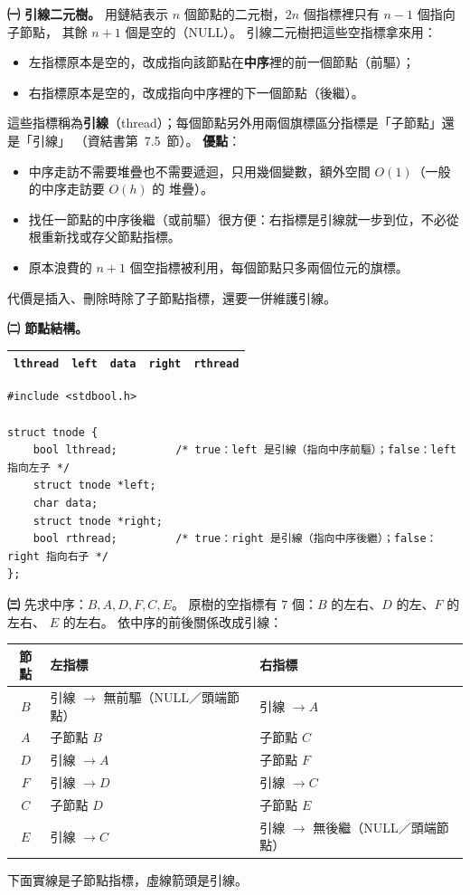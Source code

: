 \begin{pastsoln}
\textbf{㈠ 引線二元樹。} 用鏈結表示 $n$ 個節點的二元樹，$2n$ 個指標裡只有 $n - 1$ 個指向子節點，
其餘 $n + 1$ 個是空的（NULL）。 引線二元樹把這些空指標拿來用：
\begin{itemize}[nosep]
\item 左指標原本是空的，改成指向該節點在\textbf{中序}裡的前一個節點（前驅）；
\item 右指標原本是空的，改成指向中序裡的下一個節點（後繼）。
\end{itemize}
這些指標稱為\textbf{引線}（thread）；每個節點另外用兩個旗標區分指標是「子節點」還是「引線」
（資結書第~7.5~節）。
\textbf{優點}：
\begin{itemize}[nosep]
\item 中序走訪不需要堆疊也不需要遞迴，只用幾個變數，額外空間 $O(1)$（一般的中序走訪要 $O(h)$ 的
堆疊）。
\item 找任一節點的中序後繼（或前驅）很方便：右指標是引線就一步到位，不必從根重新找或存父節點指標。
\item 原本浪費的 $n + 1$ 個空指標被利用，每個節點只多兩個位元的旗標。
\end{itemize}
代價是插入、刪除時除了子節點指標，還要一併維護引線。

\textbf{㈡ 節點結構。}
\begin{center}
\begin{tabular}{|c|c|c|c|c|}
\hline
\texttt{lthread} & \texttt{left} & \texttt{data} & \texttt{right} & \texttt{rthread} \\ \hline
\end{tabular}
\end{center}
\begin{verbatim}
#include <stdbool.h>

struct tnode {
    bool lthread;         /* true：left 是引線（指向中序前驅）；false：left 指向左子 */
    struct tnode *left;
    char data;
    struct tnode *right;
    bool rthread;         /* true：right 是引線（指向中序後繼）；false：right 指向右子 */
};
\end{verbatim}

\textbf{㈢} 先求中序：$B, A, D, F, C, E$。 原樹的空指標有 $7$ 個：$B$ 的左右、$D$ 的左、$F$ 的左右、
$E$ 的左右。 依中序的前後關係改成引線：
\begin{center}
\small
\begin{tabular}{cll}
\toprule
節點 & 左指標 & 右指標 \\
\midrule
$B$ & 引線 $\to$ 無前驅（NULL／頭端節點） & 引線 $\to A$ \\
$A$ & 子節點 $B$ & 子節點 $C$ \\
$D$ & 引線 $\to A$ & 子節點 $F$ \\
$F$ & 引線 $\to D$ & 引線 $\to C$ \\
$C$ & 子節點 $D$ & 子節點 $E$ \\
$E$ & 引線 $\to C$ & 引線 $\to$ 無後繼（NULL／頭端節點） \\
\bottomrule
\end{tabular}
\end{center}
下面實線是子節點指標，虛線箭頭是引線。


\end{pastsoln}
